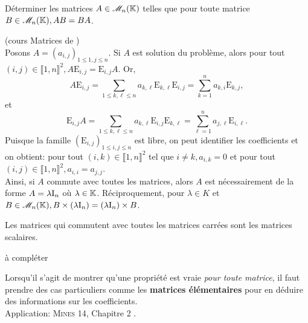 \begin{tcolorbox}
Déterminer les matrices $A \in \mathscr{M}_n(\mathbb{K})$ telles que pour toute matrice $B \in \mathscr{M}_n(\mathbb{K}), AB = BA$.
\end{tcolorbox}

\begin{preuve}
    (cours Matrices de \cite{maths-france})\\
    Posons $A = (a_{i,j})_{1 \leqslant 1, j \leqslant n}$. Si $A$ est solution du problème, alors pour tout $(i, j) \in \llbracket 1, n \rrbracket^2, A \mathrm{E}_{i,j} = \mathrm{E}_{i,j} A$. Or,
    $$A \mathrm{E}_{i,j} = \sum_{1 \leqslant k, \ell \leqslant n} a_{k, \ell} \mathrm{E}_{k,\ell} \mathrm{E}_{i,j} = \sum_{k=1}^{n} a_{k,i} \mathrm{E}_{k,j},$$
    et
    $$\mathrm{E}_{i,j} A = \sum_{1 \leqslant k, \ell \leqslant n} a_{k, \ell} \mathrm{E}_{i,j} \mathrm{E}_{k,\ell} = \sum_{\ell=1}^{n} a_{j,\ell} \mathrm{E}_{i,\ell}.$$
    Puisque la famille $(\mathrm{E}_{i, j})_{1 \leqslant i, j \leqslant n}$ est libre, on peut identifier les coefficients et on obtient: pour tout $(i, k) \in \llbracket 1, n \rrbracket^2$ tel que $i \not= k, a_{i,k}=0$ et pour tout $(i,j) \in \llbracket 1, n \rrbracket^2, a_{i,i}=a_{j,j}$. \\
    Ainsi, si $A$ commute avec toutes les matrices, alors $A$ est nécessairement de la forme $A = \lambda \mathrm{I}_n$ où $\lambda \in \mathbb{K}$. Réciproquement, pour $\lambda \in K$ et $B \in \mathscr{M}_n(\mathbb{K}), B \times (\lambda \mathrm{I}_n) = (\lambda \mathrm{I}_n) \times B$.
\end{preuve}

\begin{tcolorbox}
    Les matrices qui commutent avec toutes les matrices carrées sont les matrices scalaires.
\end{tcolorbox}


\begin{marginfigure}
à compléter
\end{marginfigure}

\begin{remarque}
    Lorsqu'il s'agit de montrer qu'une propriété est vraie \emph{pour toute matrice}, il faut prendre des cas particuliers comme les \textbf{matrices élémentaires} pour en déduire des informations sur les coefficients. \\
    Application: \textsc{Mines 14}, Chapitre 2 \cite{exos_oraux}. 
\end{remarque}